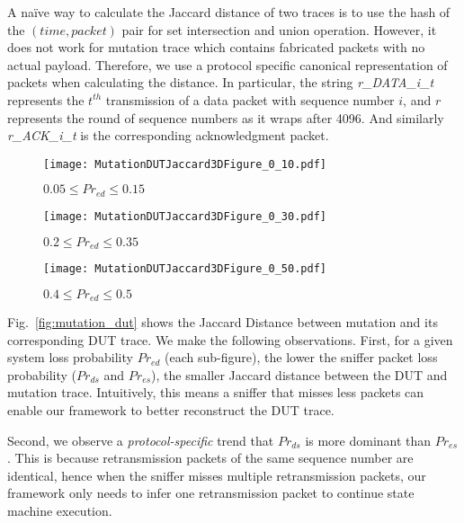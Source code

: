 A na\"ive way to calculate the Jaccard distance of two traces is to use the hash
of the $(time, packet)$ pair for set intersection and union operation.  However,
it does not work for mutation trace which contains fabricated packets with no
actual payload.  Therefore, we use a protocol specific canonical representation
of packets when calculating the distance.  In particular, the string
\textit{r\_DATA\_i\_t} represents the $t^{th}$ transmission of a data packet
with sequence number $i$, and $r$ represents the round of sequence numbers as it
wraps after 4096.  And similarly \textit{r\_ACK\_i\_t} is the corresponding
acknowledgment packet.

\begin{figure*}[t!]
  \centering
  \begin{subfigure}{0.33\textwidth}
    \centering
    \texttt{[image: MutationDUTJaccard3DFigure\_0\_10.pdf]}
    \caption{$0.05 \le Pr_{ed} \le 0.15$}
  \end{subfigure}\hspace*{0.01\textwidth}
  \begin{subfigure}{0.33\textwidth}
    \centering
    \texttt{[image: MutationDUTJaccard3DFigure\_0\_30.pdf]}
    \caption{$0.2 \le Pr_{ed} \le 0.35$}
  \end{subfigure}\hspace*{0.01\textwidth}
  \begin{subfigure}{0.33\textwidth}
    \centering
    \texttt{[image: MutationDUTJaccard3DFigure\_0\_50.pdf]}
    \caption{$0.4 \le Pr_{ed} \le 0.5$}
  \end{subfigure}\hspace*{0.01\textwidth}
  \caption{\textbf{Jaccard Distance Between Mutation and DUT Traces.} For each
  data point, the mean of the 5 runs is used.}
  \label{fig:mutation_dut}
\end{figure*}


Fig.~\ref{fig:mutation_dut} shows the Jaccard Distance between mutation and its
corresponding DUT trace. We make the following observations. First, for a given
system loss probability $Pr_{ed}$ (each sub-figure), the lower the sniffer
packet loss probability ($Pr_{ds}$ and $Pr_{es}$), the smaller Jaccard distance
between the DUT and mutation trace. Intuitively, this means a sniffer that
misses less packets can enable our framework to better reconstruct the DUT
trace.

Second, we observe a \textit{protocol-specific} trend that $Pr_{ds}$ is more
dominant than $Pr_{es}$.  This is because retransmission packets of the same
sequence number are identical, hence when the sniffer misses multiple
retransmission packets, our framework only needs to infer one retransmission
packet to continue state machine execution.

